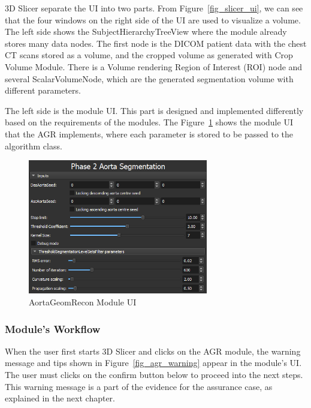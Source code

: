 3D Slicer separate the UI into two parts. From Figure~\ref{fig_slicer_ui}, we can see that the four windows on the right side of the UI are used to visualize a volume. The left side shows the SubjectHierarchyTreeView where the module already stores many data nodes. The first node is the DICOM patient data with the chest CT scans stored as a volume, and the cropped volume as generated with Crop Volume Module. There is a Volume rendering Region of Interest (ROI) node and several ScalarVolumeNode, which are the generated segmentation volume with different parameters.

The left side is the module UI. This part is designed and implemented differently based on the requirements of the modules. The Figure~\ref{fig_module_ui} shows the module UI that the AGR implements, where each parameter is stored to be passed to the algorithm class.

\begin{figure}[H]
    \centering
    \includegraphics[width=0.7\textwidth]{figures/AGR/Module_UI.png}
    \caption[AortaGeomRecon Module UI]{AortaGeomRecon Module UI}
    \label{fig_module_ui}
\end{figure}


\subsubsection{Module's Workflow} \label{module_workflow}
When the user first starts 3D Slicer and clicks on the AGR module, the warning message and tips shown in Figure~\ref{fig_agr_warning} appear in the module's UI. The user must clicks on the confirm button below to proceed into the next steps. This warning message is a part of the evidence for the assurance case, as explained in the next chapter.

